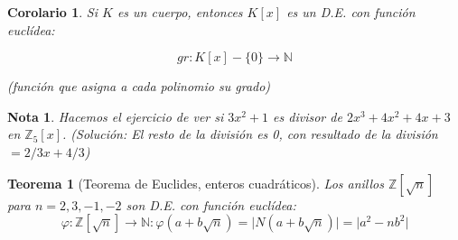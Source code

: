 \documentclass[11pt, a4paper, titlepage]{article}
\providecommand{\ent}{\mathbb{Z}}
\providecommand{\nat}{\mathbb{N}}
\providecommand{\abs}[1]{\lvert#1\rvert}
\theoremstyle{theorem-style}
\newtheorem*{nth}{Teorema}
\newtheorem{ncor}{Corolario}
\theoremstyle{definition-style}
\theoremstyle{remark-style}
\newtheorem*{nota}{Nota}
\theoremstyle{example-style}
\begin{document}
\begin{ncor}
	Si $K$ es un cuerpo, entonces $K[x]$ es un D.E. con función euclídea:
	
	\[
	gr: K[x]-\{0\} \to \nat
	\]
	
(función que asigna a cada polinomio su grado)
\end{ncor}

\begin{nota}
	Hacemos el ejercicio de ver si $3x^2 +1$ es divisor de $2x^3 + 4x^2 +4x +3$ en $\ent _5[x]$. (Solución: El resto de la división es 0, con resultado de la división $= 2/3 x + 4/3$)
\end{nota}


\begin{nth}[Teorema de Euclides, enteros cuadráticos]
	Los anillos $\ent[\sqrt{n}]$ para $n=2,3,-1,-2$ son D.E. con función euclídea:
	\[
	\varphi: \ent[\sqrt{n}] \to \nat : \varphi(a+b\sqrt{n}) = \abs{N(a+b\sqrt{n})} = \abs{a^2 - nb^2}
	\]
	
	
\end{nth}
\end{document}
